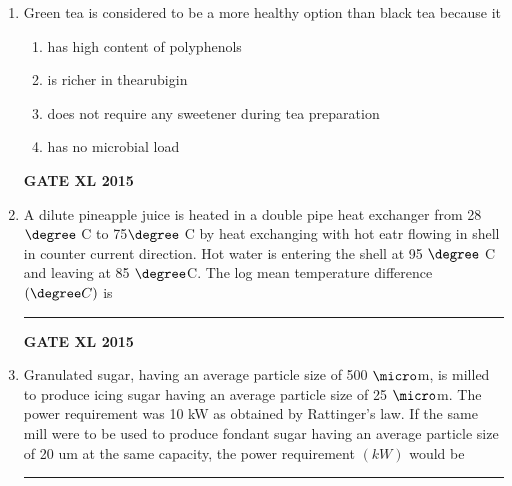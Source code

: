 \documentclass[journal,12pt,onecolumn]{IEEEtran}
\begin{document}
\begin{enumerate}
\begin{minipage}{0.5\textwidth}
\begin{flushleft}
		(Q) Red pepper

		(R) Pumpkin

		(S) Tomato 
	\end{flushleft}
	\end{minipage}
	\begin{minipage}{0.5\textwidth}\begin{flushleft}
Group II

		(1) Lycopene

		(2) B-Carotene

		(3) Capsanthin

		(4) Lutein
	\end{flushleft}
	\end{minipage}
    \begin{enumerate}
            \item P-3,Q-2,R-2,S-1
            \item P-3,Q-1,R-3,S-4
            \item P-4,Q-3,R-2,S-1
            \item P-1,Q-2,R-4,S-3
    \end{enumerate}
\item  Green tea is considered to be a more healthy option than black tea because it
    \begin{enumerate}
            \item  has high content of polyphenols
	    \item is richer in thearubigin
	    \item {does not require any sweetener during tea preparation}
	    \item {has no microbial load}
    \end{enumerate}
\hfill{\textbf{GATE XL 2015}}
\item  A dilute pineapple juice is heated in a double pipe heat exchanger from 28 $\degree$ C to 75$\degree$ C by heat exchanging with hot eatr flowing in shell in counter current direction. Hot water is entering the shell at 95 $\degree$ C and leaving at 85 $\degree$C. The log mean temperature difference $(\degree C)$ is \rule{1cm}{0.15mm}
\hfill{\textbf{GATE XL 2015}}
\item  Granulated sugar, having an average particle size of 500 $\micro$m, is milled to produce icing sugar having an average particle size of 25 $\micro$m. The power requirement was 10 kW as obtained by Rattinger's law. If the same mill were to be used to produce fondant sugar having an average particle size of 20 um at the same capacity, the power requirement $(kW)$ would be \rule{1cm}{0.15mm}
    

\end{enumerate}
\end{document}
